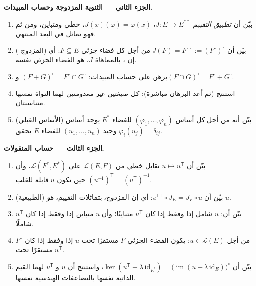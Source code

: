 \begin{problem}
\medskip
\noindent\textbf{الجزء الثاني --- الثنوية المزدوجة وحساب
المبيدات.}
\begin{enumerate}[resume]
  \item بيّن أن \emph{تطبيق التقييم} $J \colon E \to
        E^{**}$، $J(x)(\varphi) = \varphi(x)$، خطي
        ومتباين، ومن ثم فهو تماثل في البعد المنتهي.
  \item ( المزدوج) بيّن أن $J(F) = F^{\circ\circ} :=
        (F^\circ)^\circ$ من أجل كل فضاء جزئي $F \subseteq E$: أي إن
         ، بالمماهاة $J$، هو الفضاء الجزئي نفسه.
  \item برهن على حساب المبيدات: $(F + G)^\circ = F^\circ
        \cap G^\circ$ و$(F \cap G)^\circ = F^\circ + G^\circ$.
  \item استنتج (ثم أعد البرهان مباشرة): كل صيغتين غير معدومتين
        لهما النواة نفسها متناسبتان.
  \item (الأساس القبلي) بيّن أنه من أجل كل أساس $(\varphi_1,
        \dots, \varphi_n)$ للفضاء $E^*$ يوجد أساس وحيد
        $(u_1, \dots, u_n)$ للفضاء $E$ يحقق $\varphi_i(u_j) =
        \delta_{ij}$.
\end{enumerate}

\medskip
\noindent\textbf{الجزء الثالث --- حساب المنقولات.}
\begin{enumerate}[resume]
  \item بيّن أن $u \mapsto u^{\mathsf T}$ تقابل خطي
        من $\mathcal{L}(E, F)$ على $\mathcal{L}(F^*, E^*)$،
        وأن $(u^{-1})^{\mathsf T} = (u^{\mathsf T})^{-1}$
        حين تكون $u$ قابلة للقلب.
  \item (الطبيعية) بيّن أن $u^{\mathsf T\mathsf T} \circ J_E
        = J_F \circ u$: أي إن 
        المزدوج، بتماثلات التقييم، \emph{هو} $u$.
  \item بيّن أن: $u$ شامل إذا وفقط إذا كان $u^{\mathsf T}$ متباينًا؛
        وأن $u$ متباين إذا وفقط إذا كان $u^{\mathsf T}$ شاملًا.
  \item من أجل $u \in \mathcal{L}(E)$: يكون الفضاء الجزئي $F$ مستقرًا
        تحت $u$ إذا وفقط إذا كان $F^\circ$ مستقرًا تحت
        $u^{\mathsf T}$.
  \item بيّن أن $\ker(u^{\mathsf T} - \lambda\,
        \mathrm{id}_{E^*}) = \bigl(\operatorname{im}(u - \lambda\,
        \mathrm{id}_E)\bigr)^\circ$، واستنتج أن $u$ و
        $u^{\mathsf T}$ لهما القيم الذاتية نفسها بالتضاعفات
        الهندسية نفسها.
\end{enumerate}


\end{problem}
